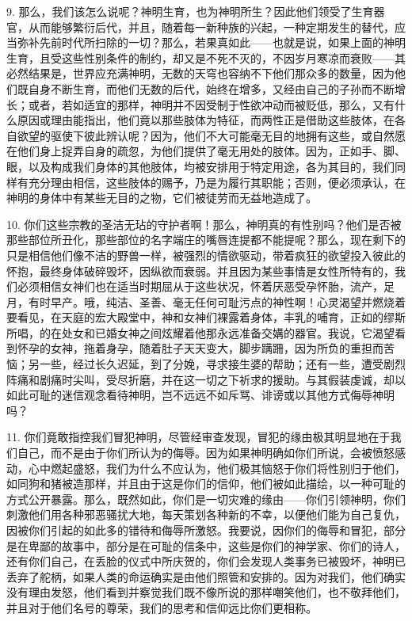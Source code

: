9. 那么，我们该怎么说呢？神明生育，也为神明所生？因此他们领受了生育器官，从而能够繁衍后代，并且，随着每一新种族的兴起，一种定期发生的替代，应当弥补先前时代所扫除的一切？那么，若果真如此——也就是说，如果上面的神明生育，且受这些性别条件的制约，却又是不死不灭的，不因岁月寒凉而衰败——其必然结果是，世界应充满神明，无数的天穹也容纳不下他们那众多的数量，因为他们既自身不断生育，而他们无数的后代，始终在增多，又经由自己的子孙而不断增长；或者，若如适宜的那样，神明并不因受制于性欲冲动而被贬低，那么，又有什么原因或理由能指出，他们竟以那些肢体为特征，而两性正是借助这些肢体，在各自欲望的驱使下彼此辨认呢？因为，他们不大可能毫无目的地拥有这些，或自然愿在他们身上捉弄自身的疏忽，为他们提供了毫无用处的肢体。因为，正如手、脚、眼，以及构成我们身体的其他肢体，均被安排用于特定用途，各为其目的，我们同样有充分理由相信，这些肢体的赐予，乃是为履行其职能；否则，便必须承认，在神明的身体中有某些无目的之物，它们被徒劳而无益地造成了。\par

10. 你们这些宗教的圣洁无玷的守护者啊！那么，神明真的有性别吗？他们是否被那些部位所丑化，那些部位的名字端庄的嘴唇连提都不能提呢？那么，现在剩下的只是相信他们像不洁的野兽一样，被强烈的情欲驱动，带着疯狂的欲望投入彼此的怀抱，最终身体破碎毁坏，因纵欲而衰弱。并且因为某些事情是女性所特有的，我们必须相信女神们也在适当时期屈从于这些状况，怀着厌恶受孕怀胎，流产，足月，有时早产。哦，纯洁、圣善、毫无任何可耻污点的神性啊！心灵渴望并燃烧着要看见，在天庭的宏大殿堂中，神和女神们裸露着身体，丰乳的哺育，正如的缪斯所唱，的在处女和已婚女神之间炫耀着他那永远准备交媾的器官。我说，它渴望看到怀孕的女神，拖着身孕，随着肚子天天变大，脚步蹒跚，因为所负的重担而苦恼；另一些，经过长久迟延，到了分娩，寻求接生婆的帮助；还有一些，遭受剧烈阵痛和剧痛时尖叫，受尽折磨，并在这一切之下祈求的援助。与其假装虔诚，却以如此可耻的迷信观念看待神明，岂不远远不如斥骂、诽谤或以其他方式侮辱神明吗？\par

11. 你们竟敢指控我们冒犯神明，尽管经审查发现，冒犯的缘由极其明显地在于我们自己，而不是由于你们所认为的侮辱。因为如果神明确如你们所说，会被愤怒感动，心中燃起盛怒，我们为什么不应认为，他们极其恼怒于你们将性别归于他们，如同狗和猪被造那样，并且由于这是你们的信仰，他们被如此描绘，以一种可耻的方式公开暴露。那么，既然如此，你们是一切灾难的缘由——你们引领神明，你们刺激他们用各种邪恶骚扰大地，每天策划各种新的不幸，以便他们能为自己复仇，因被你们引起的如此多的错待和侮辱所激怒。我要说，因你们的侮辱和冒犯，部分是在卑鄙的故事中，部分是在可耻的信条中，这些是你们的神学家、你们的诗人，还有你们自己，在丢脸的仪式中所庆贺的，你们会发现人类事务已被毁坏，神明已丢弃了舵柄，如果人类的命运确实是由他们照管和安排的。因为对我们，他们确实没有理由发怒，他们看到并察觉我们既不像所说的那样嘲笑他们，也不敬拜他们，并且对于他们名号的尊荣，我们的思考和信仰远比你们更相称。\par

